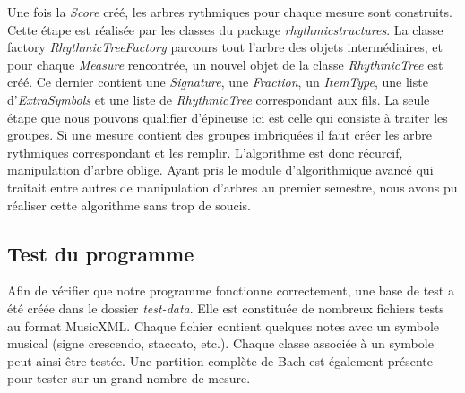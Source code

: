 Une fois la \emph{Score} créé, les arbres rythmiques pour chaque mesure sont construits. Cette étape est réalisée par les classes du package \emph{rhythmicstructures}. La classe factory \emph{RhythmicTreeFactory} parcours tout l'arbre des objets intermédiaires, et pour chaque \emph{Measure} rencontrée, un nouvel objet de la classe \emph{RhythmicTree} est créé. Ce dernier contient une \emph{Signature}, une \emph{Fraction}, un \emph{ItemType}, une liste d'\emph{ExtraSymbols} et une liste de \emph{RhythmicTree} correspondant aux fils. La seule étape que nous pouvons qualifier d'épineuse ici est celle qui consiste à traiter les groupes. Si une mesure contient des groupes imbriquées il faut créer les arbre rythmiques correspondant et les remplir. L'algorithme est donc récurcif, manipulation d'arbre oblige. Ayant pris le module d'algorithmique avancé qui traitait entre autres de manipulation d'arbres au premier semestre, nous avons pu réaliser cette algorithme sans trop de soucis.


\subsection{Test du programme}

Afin de vérifier que notre programme fonctionne correctement, une base de test a été créée dans le dossier \emph{test-data}. Elle est constituée de nombreux fichiers tests au format MusicXML. Chaque fichier contient quelques notes avec un symbole musical (signe crescendo, staccato, etc.). Chaque classe associée à un symbole peut ainsi être testée. Une partition complète de Bach est également présente pour tester sur un grand nombre de mesure.
